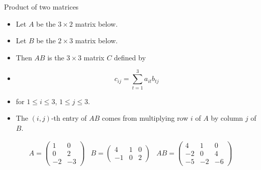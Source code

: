 \documentclass{beamer}
\begin{document}
\begin{frame}{Product of two matrices}

\begin{itemize}
\item Let $A$ be the $3\times 2$ matrix below.
\item Let $B$ be the $2\times 3$ matrix below.
\item Then $A B$ is the $3 \times 3$ matrix $C$ defined by
\item $$c_{ij} = \sum_{t=1}^3 a_{it} b_{tj}$$
\item for $1\leq i \leq 3$, $1\leq j \leq 3$.
\item The $(i,j)$-th entry of $A B$ comes from multiplying row $i$ of $A$
by column $j$ of $B$.
\end{itemize}

$$
\begin{matrix}
A =

\begin{pmatrix}
1 & 0 \\
0 & 2 \\
-2 & -3
\end{pmatrix}

&

B =

\begin{pmatrix}
4  & 1 & 0 \\
-1 & 0 & 2
\end{pmatrix}

&

A B =

\begin{pmatrix}
4 & 1 & 0 \\
-2 & 0 & 4 \\
-5 & -2 & -6
\end{pmatrix}

\end{matrix}
$$

\end{frame}

\end{document}

